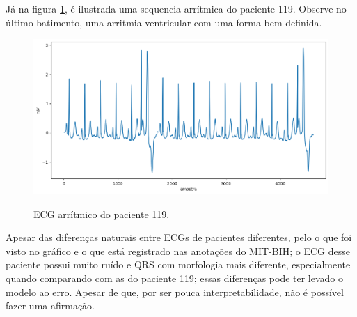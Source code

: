 Já na figura \ref{fig:acert_posclass_paciente_mais_facil}, é ilustrada uma sequencia arrítmica do paciente 119.
Observe no último batimento, uma arritmia ventricular com uma forma bem definida.

\begin{figure}[H]
  \centering
  \caption{ECG arrítmico do paciente 119.}
   \includegraphics[width=1.0\textwidth]{figuras/analise_erros/ecg_sequencia_normal_pos_paciente_mais_facil.png} 
  \label{fig:acert_posclass_paciente_mais_facil}
\end{figure}

Apesar das diferenças naturais entre ECGs de pacientes diferentes, pelo o que foi visto no gráfico e o que está registrado
nas anotações do MIT-BIH; o ECG desse paciente possui muito ruído e QRS com morfologia mais diferente, especialmente
quando comparando com as do paciente 119; essas diferenças pode ter levado o modelo ao erro. Apesar de que, por ser 
pouca interpretabilidade, não é possível fazer uma afirmação.

